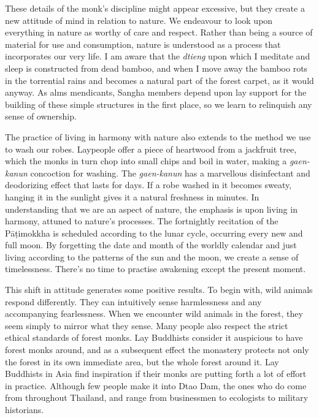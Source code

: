 These details of the monk's discipline might appear excessive, but they
create a new attitude of mind in relation to nature. We endeavour to
look upon everything in nature as worthy of care and respect. Rather
than being a source of material for use and consumption, nature is
understood as a process that incorporates our very life. I am aware that
the \emph{dtieng} upon which I meditate and sleep is constructed from
dead bamboo, and when I move away the bamboo rots in the torrential
rains and becomes a natural part of the forest carpet, as it would
anyway. As alms mendicants, Sangha members depend upon lay support for
the building of these simple structures in the first place, so we learn
to relinquish any sense of ownership.

The practice of living in harmony
with nature also extends to the method we use to wash our robes. 
Laypeople offer a piece of heartwood from a jackfruit tree, which the
monks in turn chop into small chips and boil in water, making a
\emph{gaen-kanun} concoction for washing. The \emph{gaen-kanun} has a
marvellous disinfectant and deodorizing effect that lasts for days. If a
robe washed in it becomes sweaty, hanging it in the sunlight gives it a
natural freshness in minutes. In understanding that we are an aspect of
nature, the emphasis is upon living in harmony, attuned to nature's
processes. The fortnightly recitation of the Pāṭimokkha is scheduled
according to the lunar cycle, occurring every new and full moon. By
forgetting the date and month of the worldly calendar and just living
according to the patterns of the sun and the moon, we create a sense of
timelessness. There's no time to practise awakening except the present
moment. 

This shift in attitude generates some positive results. To begin with, 
wild animals respond differently. They can intuitively sense
harmlessness and any accompanying fearlessness. When we encounter wild
animals in the forest, they seem simply to mirror what they sense. Many
people also respect the strict ethical standards of forest monks. Lay
Buddhists consider it auspicious to have forest monks around, and as a
subsequent effect the monastery protects not only the forest in its own
immediate area, but the whole forest around it. Lay Buddhists in Asia
find inspiration if their monks are putting forth a lot of effort in
practice. Although few people make it into Dtao Dam, the ones who do
come from throughout Thailand, and range from businessmen to ecologists
to military historians. 

